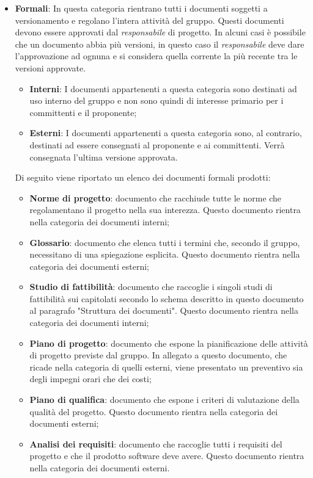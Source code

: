 \documentclass[../norme_di_progetto.tex]{subfiles}
\begin{document}
\begin{itemize}
    \item \textbf{Formali}: In questa categoria rientrano tutti i documenti soggetti a versionamento e regolano l'intera attività del gruppo. Questi documenti devono essere approvati dal \emph{responsabile} di progetto. In alcuni casi è possibile che un documento abbia più versioni, in questo caso il \emph{responsabile} deve dare l'approvazione ad ognuna e si considera quella corrente la più recente tra le versioni approvate.\par
    \begin{itemize}
        \item \textbf{Interni}: I documenti appartenenti a questa categoria sono destinati ad uso interno del gruppo e non sono quindi di interesse primario per i committenti e il proponente;
        \item \textbf{Esterni}: I documenti appartenenti a questa categoria sono, al contrario, destinati ad essere consegnati al proponente e ai committenti. Verrà consegnata l'ultima versione approvata.
    \end{itemize}
    Di seguito viene riportato un elenco dei documenti formali prodotti:
    \begin{itemize}
        \item \textbf{Norme di progetto}: documento che racchiude tutte le norme che regolamentano il progetto nella sua interezza. Questo documento rientra nella categoria dei documenti interni;
        \item \textbf{Glossario}: documento che elenca tutti i termini che, secondo il gruppo, necessitano di una spiegazione esplicita. Questo documento rientra nella categoria dei documenti esterni;
        \item \textbf{Studio di fattibilità}: documento che raccoglie i singoli studi di fattibilità sui capitolati secondo lo schema descritto in questo documento al paragrafo "Struttura dei documenti". Questo documento rientra nella categoria dei documenti interni;
        \item \textbf{Piano di progetto}: documento che espone la pianificazione delle attività di progetto previste dal gruppo. In allegato a questo documento, che ricade nella categoria di quelli esterni, viene presentato un preventivo sia degli impegni orari che dei costi;
        \item \textbf{Piano di qualifica}: documento che espone i criteri di valutazione della qualità del progetto. Questo documento rientra nella categoria dei documenti esterni;
        \item \textbf{Analisi dei requisiti}: documento che raccoglie tutti i requisiti del progetto e che il prodotto software deve avere. Questo documento rientra nella categoria dei documenti esterni.
  \end{itemize}
  
\end{itemize}
\end{document}

